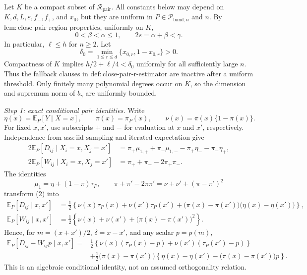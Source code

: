 Let \(K\) be a compact subset of \(\mathcal R_{\mathrm{pair}}\).  All constants below may depend on \(K,d,L,\varepsilon,f_{-},f_{+}\), and \(x_0\), but they are uniform in \(P\in\mathcal P_{\mathrm{band},n}\) and \(n\).  By \(\mathrm{lem:close\mbox{-}pair\mbox{-}region\mbox{-}properties}\), uniformly on \(K\),
\[
0<\beta<\alpha\leq1,
\qquad 2s=\alpha+\beta<\gamma.
\tag{1}
\]
In particular, \(\ell\leq h\) for \(n\geq2\).  Let
\[
\delta_0=\min_{1\leq r\leq d}\{x_{0,r},1-x_{0,r}\}>0.
\]
Compactness of \(K\) implies \(h/2+\ell/4<\delta_0\) uniformly for all sufficiently large \(n\).  Thus the fallback clauses in \(\mathrm{def:close\mbox{-}pair\mbox{-}r\mbox{-}estimator}\) are inactive after a uniform threshold.  Only finitely many polynomial degrees occur on \(K\), so the dimension and supremum norm of \(b_\gamma\) are uniformly bounded.

\emph{Step 1: exact conditional pair identities.}
Write
\[
\eta(x)=\mathbb E_P[Y\mid X=x],
\qquad \pi(x)=\pi_P(x),
\qquad \nu(x)=\pi(x)\{1-\pi(x)\}.
\]
For fixed \(x,x'\), use subscripts \(+\) and \(-\) for evaluation at \(x\) and \(x'\), respectively.  Independence from \(\mathrm{ass:iid\mbox{-}sampling}\) and iterated expectation give
\[
\begin{aligned}
2\mathbb E_P[D_{ij}\mid X_i=x,X_j=x']
&=\pi_+\mu_{1,+}+\pi_-\mu_{1,-}
-\pi_+\eta_- -\pi_-\eta_+,\\
2\mathbb E_P[W_{ij}\mid X_i=x,X_j=x']
&=\pi_++\pi_- -2\pi_+\pi_-.
\end{aligned}
\tag{2}
\]
The identities
\[
\mu_1=\eta+(1-\pi)\tau_P,
\qquad
\pi+\pi'-2\pi\pi'=\nu+\nu'+(\pi-\pi')^2
\]
transform (2) into
\[
\begin{aligned}
\mathbb E_P[D_{ij}\mid x,x']
&=\frac12\left\{
\nu(x)\tau_P(x)+\nu(x')\tau_P(x')
+\bigl(\pi(x)-\pi(x')\bigr)
\bigl(\eta(x)-\eta(x')\bigr)
\right\},\\
\mathbb E_P[W_{ij}\mid x,x']
&=\frac12\left\{
\nu(x)+\nu(x')+\bigl(\pi(x)-\pi(x')\bigr)^2
\right\}.
\end{aligned}
\tag{3}
\]
Hence, for \(m=(x+x')/2\), \(\delta=x-x'\), and any scalar \(p=p(m)\),
\[
\begin{aligned}
\mathbb E_P[D_{ij}-W_{ij}p\mid x,x']
={}&\frac12\left\{
\nu(x)(\tau_P(x)-p)+\nu(x')(\tau_P(x')-p)
\right\}\\
&+\frac12\bigl(\pi(x)-\pi(x')\bigr)
\left\{
\eta(x)-\eta(x')-\bigl(\pi(x)-\pi(x')\bigr)p
\right\}.
\end{aligned}
\tag{4}
\]
This is an algebraic conditional identity, not an assumed orthogonality relation.


